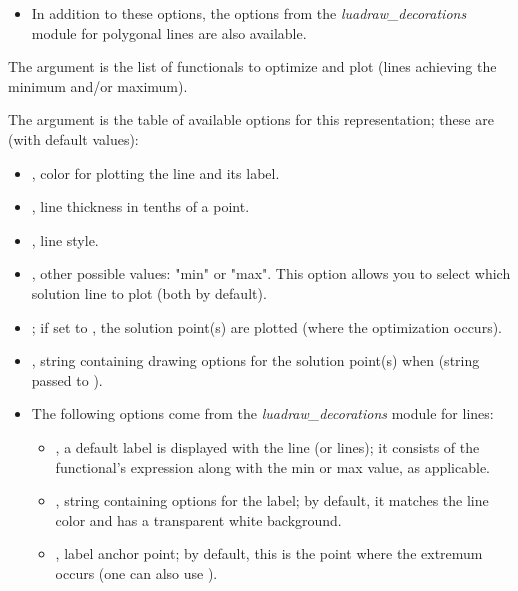 \begin{itemize}
\begin{itemize}
        \item In addition to these options, the options from the \emph{luadraw\_decorations} module for polygonal lines are also available. 
    \end{itemize}
    
    The  argument is the list of functionals to optimize and plot (lines achieving the minimum and/or maximum). 

    The  argument is the table of available options for this representation; these are (with default values):
    \begin{itemize}
        \item {}, color for plotting the line and its label. 

        \item {}, line thickness in tenths of a point. 

        \item {}, line style. 

        \item {}, other possible values: "min" or "max". This option allows you to select which solution line to plot (both by default). 

        \item {}; if set to \true, the solution point(s) are plotted (where the optimization occurs). 

        \item {}, string containing drawing options for the solution point(s) when  (string passed to \drawcmd). 

        \item The following options come from the \emph{luadraw\_decorations} module for lines:
        \begin{itemize}
            \item {}, a default label is displayed with the line (or lines); it consists of the functional's expression along with the min or max value, as applicable. 

            \item {}, string containing options for the label; by default, it matches the line color and has a transparent white background. 

            \item {}, label anchor point; by default, this is the point where the extremum occurs (one can also use ). 


\end{itemize}
\end{itemize}
\end{itemize}
